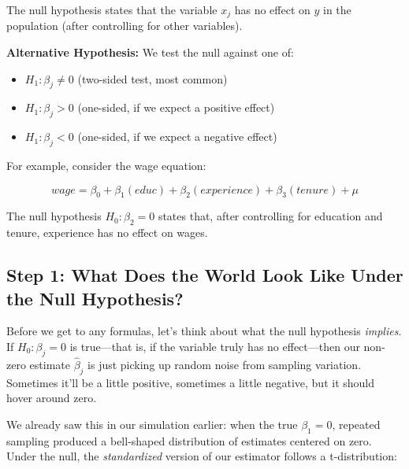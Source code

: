 \documentclass[
  letterpaper,
  DIV=11,
  numbers=noendperiod]{scrreprt}
\providecommand{\tightlist}{%
  \setlength{\itemsep}{0pt}\setlength{\parskip}{0pt}}
\begin{document}
The null hypothesis states that the variable \(x_j\) has no effect on
\(y\) in the population (after controlling for other variables).

\textbf{Alternative Hypothesis:} We test the null against one of:

\begin{itemize}
\tightlist
\item
  \(H_1: \beta_j \neq 0\) (two-sided test, most common)
\item
  \(H_1: \beta_j > 0\) (one-sided, if we expect a positive effect)
\item
  \(H_1: \beta_j < 0\) (one-sided, if we expect a negative effect)
\end{itemize}

For example, consider the wage equation:

\[wage = \beta_0 + \beta_1(educ) + \beta_2(experience) + \beta_3(tenure) + \mu\]

The null hypothesis \(H_0: \beta_2 = 0\) states that, after controlling
for education and tenure, experience has no effect on wages.

\subsection{Step 1: What Does the World Look Like Under the Null
Hypothesis?}\label{step-1-what-does-the-world-look-like-under-the-null-hypothesis}

Before we get to any formulas, let's think about what the null
hypothesis \emph{implies}. If \(H_0: \beta_j = 0\) is true---that is, if
the variable truly has no effect---then our non-zero estimate
\(\hat{\beta}_j\) is just picking up random noise from sampling
variation. Sometimes it'll be a little positive, sometimes a little
negative, but it should hover around zero.

We already saw this in our simulation earlier: when the true
\(\beta_1 = 0\), repeated sampling produced a bell-shaped distribution
of estimates centered on zero. Under the null, the \emph{standardized}
version of our estimator follows a t-distribution:
\end{document}
